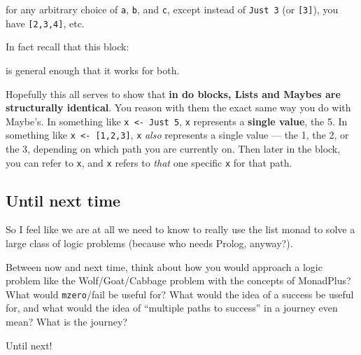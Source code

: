 \documentclass[]{article}
\newenvironment{Shaded}{}{}
\newcommand{\KeywordTok}[1]{\textcolor[rgb]{0.00,0.44,0.13}{\textbf{{#1}}}}
\newcommand{\DataTypeTok}[1]{\textcolor[rgb]{0.56,0.13,0.00}{{#1}}}
\newcommand{\DecValTok}[1]{\textcolor[rgb]{0.25,0.63,0.44}{{#1}}}
\newcommand{\OtherTok}[1]{\textcolor[rgb]{0.00,0.44,0.13}{{#1}}}
\newcommand{\FunctionTok}[1]{\textcolor[rgb]{0.02,0.16,0.49}{{#1}}}
\newcommand{\NormalTok}[1]{{#1}}
\begin{document}
\begin{Shaded}
\end{Shaded}

for any arbitrary choice of \texttt{a}, \texttt{b}, and \texttt{c}, except instead of
\texttt{Just\ 3} (or \texttt{{[}3{]}}), you have \texttt{{[}2,3,4{]}}, etc.

In fact recall that this block:

\begin{Shaded}
\end{Shaded}

is general enough that it works for both.

Hopefully this all serves to show that \textbf{in do blocks, Lists and Maybes are structurally
identical}. You reason with them the exact same way you do with Maybe's. In something like
\texttt{x\ \textless{}-\ Just\ 5}, \texttt{x} represents a \textbf{single value}, the 5. In
something like \texttt{x\ \textless{}-\ {[}1,2,3{]}}, \texttt{x} \emph{also} represents a single
value --- the 1, the 2, or the 3, depending on which path you are currently on. Then later in the
block, you can refer to \texttt{x}, and \texttt{x} refers to \emph{that} one specific \texttt{x} for
that path.

\subsection{Until next time}\label{until-next-time}

So I feel like we are at all we need to know to really use the list monad to solve a large class of
logic problems (because who needs Prolog, anyway?).

Between now and next time, think about how you would approach a logic problem like the
Wolf/Goat/Cabbage problem with the concepts of MonadPlus? What would \texttt{mzero}/fail be useful
for? What would the idea of a success be useful for, and what would the idea of ``multiple paths to
success'' in a journey even mean? What is the journey?

Until next!
\end{document}
